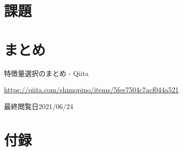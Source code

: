 \documentclass[12pt]{jarticle}
\begin{document}
\clearpage
\section{課題}
\section{まとめ}



\clearpage
\begin{thebibliography}{99}
    \label{sannkoubunnkenn_chapter}
    特徴量選択のまとめ - Qiita

    \url{https://qiita.com/shimopino/items/5fee7504c7acf044a521}

    最終閲覧日2021/06/24
\end{thebibliography}

\clearpage
\appendix
\section{付録}
\begin{lstlisting}[style = php,caption=1\_functions.php]

\end{lstlisting}

\end{document}
